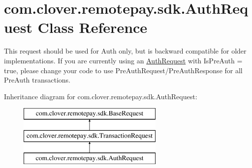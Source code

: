 \hypertarget{classcom_1_1clover_1_1remotepay_1_1sdk_1_1_auth_request}{}\section{com.\+clover.\+remotepay.\+sdk.\+Auth\+Request Class Reference}
\label{classcom_1_1clover_1_1remotepay_1_1sdk_1_1_auth_request}


This request should be used for Auth only, but is backward compatible for older implementations. If you are currently using an \hyperlink{classcom_1_1clover_1_1remotepay_1_1sdk_1_1_auth_request}{Auth\+Request} with Is\+Pre\+Auth = true, please change your code to use Pre\+Auth\+Request/\+Pre\+Auth\+Response for all Pre\+Auth transactions.  


Inheritance diagram for com.\+clover.\+remotepay.\+sdk.\+Auth\+Request\+:\begin{figure}[H]
\begin{center}
\leavevmode
\includegraphics[height=3.000000cm]{classcom_1_1clover_1_1remotepay_1_1sdk_1_1_auth_request}
\end{center}
\end{figure}
